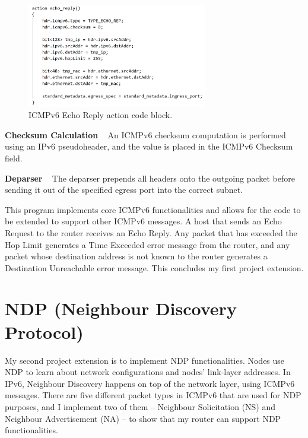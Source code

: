 \begin{figure}[htbp]
  \centering
    \includegraphics[width=0.7\textwidth]{figures/implementation/icmpv6_echoreply.png}
     \caption{ICMPv6 Echo Reply action code block.}
     \label{fig:impl-icmpv6echoreply}
\end{figure}

\textbf{Checksum Calculation} ~ An ICMPv6 checksum computation is performed using an IPv6 pseudoheader, and the value is placed in the ICMPv6 Checksum field.

\textbf{Deparser} ~ The deparser prepends all headers onto the outgoing packet before sending it out of the specified egress port into the correct subnet.

This program implements core ICMPv6 functionalities and allows for the code to be extended to support other ICMPv6 messages. A host that sends an Echo Request to the router receives an Echo Reply. Any packet that has exceeded the Hop Limit generates a Time Exceeded error message from the router, and any packet whose destination address is not known to the router generates a Destination Unreachable error message. This concludes my first project extension. 



\section{NDP (Neighbour Discovery Protocol)}
\label{sec:3.6}

My second project extension is to implement NDP functionalities. Nodes use NDP to learn about network configurations and nodes' link-layer addresses. In IPv6, Neighbour Discovery happens on top of the network layer, using ICMPv6 messages. There are five different packet types in ICMPv6 that are used for NDP purposes, and I implement two of them -- Neighbour Solicitation (NS) and Neighbour Advertisement (NA) -- to show that my router can support NDP functionalities.



